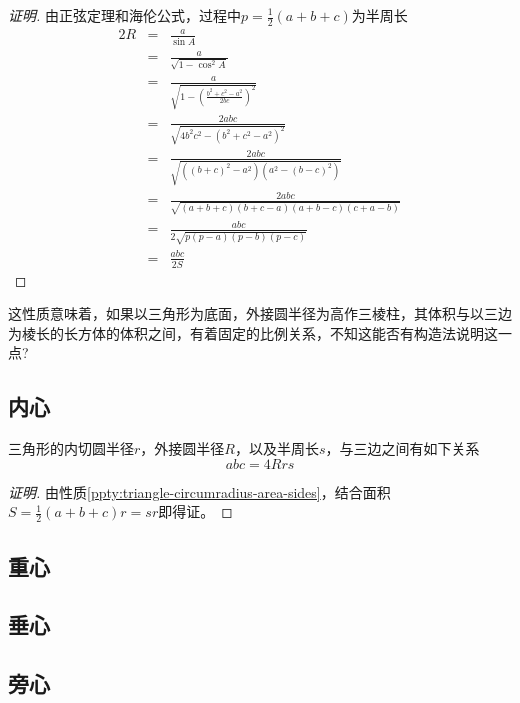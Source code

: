 \begin{proof}[证明]
  由正弦定理和海伦公式，过程中$p=\frac{1}{2}(a+b+c)$为半周长
  \begin{eqnarray*}
    2R & = & \frac{a}{\sin{A}} \\
       & = & \frac{a}{\sqrt{1-\cos^2{A}}} \\
       & = & \frac{a}{\sqrt{1-\left( \frac{b^2+c^2-a^2}{2bc} \right)^2}} \\
       & = & \frac{2abc}{\sqrt{4b^2c^2-(b^2+c^2-a^2)^2}} \\
       & = & \frac{2abc}{\sqrt{((b+c)^2-a^2)(a^2-(b-c)^2)}} \\
       & = & \frac{2abc}{\sqrt{(a+b+c)(b+c-a)(a+b-c)(c+a-b)}} \\
       & = & \frac{abc}{2 \sqrt{p(p-a)(p-b)(p-c)}} \\
    & = & \frac{abc}{2S}
  \end{eqnarray*}
\end{proof}

这性质意味着，如果以三角形为底面，外接圆半径为高作三棱柱，其体积与以三边为棱长的长方体的体积之间，有着固定的比例关系，不知这能否有构造法说明这一点?

\subsection{内心}
\label{sec:triangle-incenter}

\begin{property}
  三角形的内切圆半径$r$，外接圆半径$R$，以及半周长$s$，与三边之间有如下关系
  \begin{equation}
    \label{eq:triangle-abc-equal-4Rrs}
    abc = 4Rrs
  \end{equation}
\end{property}

\begin{proof}[证明]
 由性质\ref{ppty:triangle-circumradius-area-sides}，结合面积$S=\frac{1}{2}(a+b+c)r=sr$即得证。
\end{proof}

\subsection{重心}
\label{sec:triangle-centroid}

\subsection{垂心}
\label{sec:triangle-orthocentre}

\subsection{旁心}
\label{sec:escenter}




